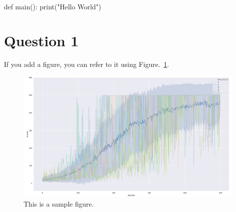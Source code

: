 \documentclass[12pt]{article}
\begin{document}
\begin{pycode}
def main():
    print("Hello World")
\end{pycode}

\section{Question 1}

If you add a figure, you can refer to it using Figure.~\ref*{fig:fig1}.

\begin{figure}[h] 
	\centering  %
    \includegraphics[width=0.3\columnwidth]{img/training.pdf}
	\caption{This is a sample figure.}
	\label{fig:fig1}
\end{figure}


\end{document}
